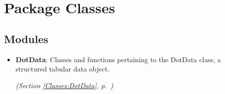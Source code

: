 %
%
%


\section{Package Classes}

    \label{Classes}


\subsection{Modules}

\begin{itemize}
\setlength{\parskip}{0ex}
\item \textbf{DotData}: Classes and functions pertaining to the DotData class, a structured tabular
data object.



  \textit{(Section \ref{Classes:DotData}, p.~\pageref{Classes:DotData})}

\end{itemize}

